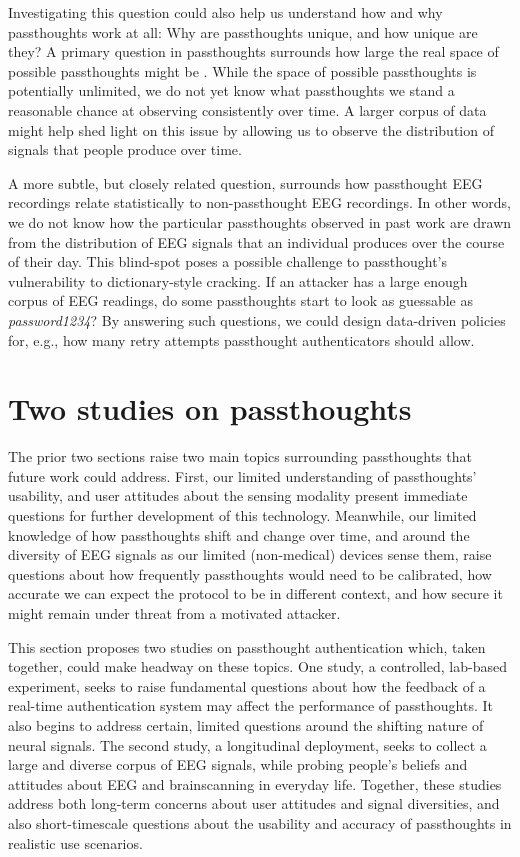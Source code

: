 \documentclass[sigconf]{acmart}
\begin{document}
Investigating this question could also help us understand how and why passthoughts work at all: Why are passthoughts unique, and how unique are they?
A primary question in passthoughts surrounds how large the real space of possible passthoughts might be \cite{Thorpe2005}.
While the space of possible passthoughts is potentially unlimited, we do not yet know what passthoughts we stand a reasonable chance at observing consistently over time.
A larger corpus of data might help shed light on this issue by allowing us to observe the distribution of signals that people produce over time.

A more subtle, but closely related question, surrounds how passthought EEG recordings relate statistically to non-passthought EEG recordings.
In other words, we do not know how the particular passthoughts observed in past work are drawn from the distribution of EEG signals that an individual produces over the course of their day.
This blind-spot poses a possible challenge to passthought's vulnerability to dictionary-style cracking.
If an attacker has a large enough corpus of EEG readings, do some passthoughts start to look as guessable as \emph{password1234}?
By answering such questions, we could design data-driven policies for, e.g., how many retry attempts passthought authenticators should allow.

\section{Two studies on passthoughts}
\label{sec:orgf574c57}

The prior two sections raise two main topics surrounding passthoughts that future work could address. 
First, our limited understanding of passthoughts' usability, and user attitudes about the sensing modality present immediate questions for further development of this technology.
Meanwhile, our limited knowledge of how passthoughts shift and change over time, and around the diversity of EEG signals as our limited (non-medical) devices sense them,
raise questions about how frequently passthoughts would need to be calibrated, how accurate we can expect the protocol to be in different context, and how secure it might remain under threat from a motivated attacker.

This section proposes two studies on passthought authentication which, taken together, could make headway on these topics.
One study, a controlled, lab-based experiment, seeks to raise fundamental questions about how the feedback of a real-time authentication system may affect the performance of passthoughts.
It also begins to address certain, limited questions around the shifting nature of neural signals.
The second study, a longitudinal deployment, seeks to collect a large and diverse corpus of EEG signals, while probing people's beliefs and attitudes about EEG and brainscanning in everyday life.
Together, these studies address both long-term concerns about user attitudes and signal diversities, and also short-timescale questions about the usability and accuracy of passthoughts in realistic use scenarios.
\end{document}
